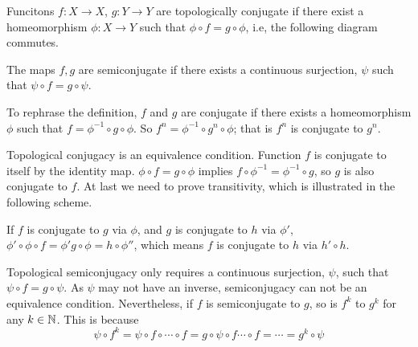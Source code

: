 \begin{defn}
Funcitons $f: X \rightarrow X$, $g:  Y \rightarrow Y$ are topologically conjugate if there exist a homeomorphism $\phi: X \rightarrow Y$ such that 
$\phi \circ f = g \circ \phi$,
i.e, the following diagram commutes.
\begin{center}
\end{center}

The maps $f,g$ are semiconjugate if there exists a continuous surjection, $\psi$ such that $\psi \circ f = g \circ \psi$.
\end{defn}


To rephrase the definition, $f $ and $g$ are conjugate if there exists a homeomorphism $\phi$ such that $f = \phi^{-1} \circ g \circ \phi$.
So $f^{n} = \phi^{-1} \circ g^{n} \circ \phi$; that is $f^n$ is conjugate to $g^n$.

Topological conjugacy is an equivalence condition. 
Function $f$ is conjugate to itself by the identity map. 
$\phi \circ f = g \circ \phi$ implies $f \circ \phi^{-1} = \phi^{-1} \circ g$, so $g$ is also conjugate to $f$.
At last we need to prove transitivity, which is illustrated in the following scheme.
\begin{center}
\end{center}
If $f$  is conjugate to $g$ via $\phi$, and $g$ is conjugate to $h$ via $\phi'$, $\phi' \circ \phi \circ f = \phi' g \circ \phi = h \circ \phi'' $, which means $f$ is conjugate to $h$ via $h' \circ h$. 



Topological semiconjugacy only requires a continuous surjection, $\psi$, such that $\psi \circ f = g \circ \psi$. 
As $\psi$ may not have an inverse, semiconjugacy can not be an equivalence condition.
Nevertheless, if $f$ is semiconjugate to $g$, so is $f^{k}$ to $g^{k}$ for any $k \in \mathbb{N}$. 
This is because 
$$
	\psi \circ f ^k = \psi \circ f\circ \cdots \circ f = g \circ \psi \circ f \cdots \circ f = \cdots = g^k \circ \psi
$$

